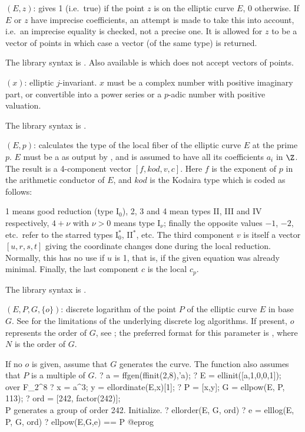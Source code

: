 $(E,z)$: \label{se:ellisoncurve}gives 1 (i.e.~true) if the point $z$ is on the elliptic curve $E$, 0
otherwise. If $E$ or $z$ have imprecise coefficients, an attempt is made to
take this into account, i.e.~an imprecise equality is checked, not a precise
one. It is allowed for $z$ to be a vector of points in which case a vector
(of the same type) is returned.

The library syntax is .
Also available is  which does not
accept vectors of points.

$(x)$: \label{se:ellj}
elliptic $j$-invariant. $x$ must be a complex number
with positive imaginary part, or convertible into a power series or a
$p$-adic number with positive valuation.

The library syntax is .

$(E,p)$: \label{se:elllocalred}
calculates the  type of the
local fiber of the elliptic curve $E$ at the prime $p$.
$E$ must be a  as output by , and is assumed to have
all its coefficients $a_i$ in $\Z$. The result is a 4-component vector
$[f,kod,v,c]$. Here $f$ is the exponent of $p$ in the arithmetic conductor of
$E$, and $kod$ is the Kodaira type which is coded as follows:

1 means good reduction (type I$_0$), 2, 3 and 4 mean types II, III and IV
respectively, $4+\nu$ with $\nu>0$ means type I$_\nu$;
finally the opposite values $-1$, $-2$, etc.~refer to the starred types
I$_0^*$, II$^*$, etc. The third component $v$ is itself a vector $[u,r,s,t]$
giving the coordinate changes done during the local reduction. Normally, this
has no use if $u$ is 1, that is, if the given equation was already minimal.
Finally, the last component $c$ is the local  $c_p$.

The library syntax is .

$(E,P,G,\{o\})$: \label{se:elllog}discrete logarithm of the point $P$ of the elliptic curve $E$ in base $G$.
See  for the limitations of the underlying discrete log algorithms.
If present, $o$ represents the order of $G$, see ;
the preferred format for this parameter is \kbd{[N, factor(N)]}, where $N$
is  the order of $G$.

If no $o$ is given, assume that $G$ generates the curve.
The function also assumes that $P$ is a multiple of $G$.
\bprog
? a = ffgen(ffinit(2,8),'a);
? E = ellinit([a,1,0,0,1]);  \\ over F_{2^8}
? x = a^3; y = ellordinate(E,x)[1];
? P = [x,y]; G = ellpow(E, P, 113);
? ord = [242, factor(242)]; \\ P generates a group of order 242. Initialize.
? ellorder(E, G, ord)
? e = elllog(E, P, G, ord)
? ellpow(E,G,e) == P
@eprog

